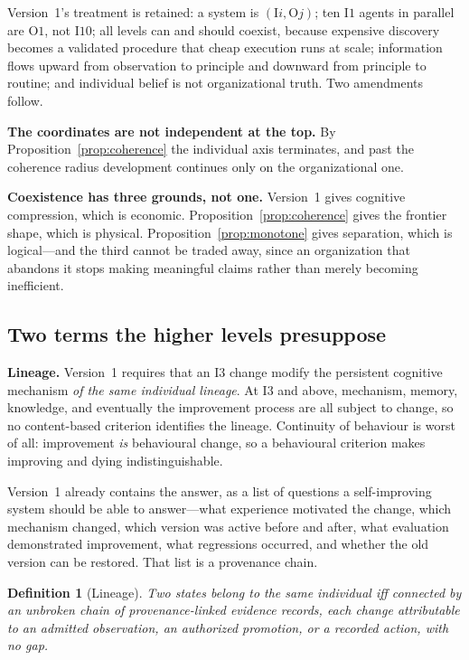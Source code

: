 \documentclass[11pt]{article}
\newtheorem{definition}{Definition}
\newcommand{\Ilev}[1]{\ensuremath{\mathrm{I}#1}}
\newcommand{\Olev}[1]{\ensuremath{\mathrm{O}#1}}
\begin{document}
Version~1's treatment is retained: a system is $(\Ilev{i}, \Olev{j})$; ten \Ilev{1} agents in parallel are \Olev{1}, not $\Ilev{10}$; all levels can and should coexist, because expensive discovery becomes a validated procedure that cheap execution runs at scale; information flows upward from observation to principle and downward from principle to routine; and individual belief is not organizational truth. Two amendments follow.

\textbf{The coordinates are not independent at the top.} By Proposition~\ref{prop:coherence} the individual axis terminates, and past the coherence radius development continues only on the organizational one.

\textbf{Coexistence has three grounds, not one.} Version~1 gives cognitive compression, which is economic. Proposition~\ref{prop:coherence} gives the frontier shape, which is physical. Proposition~\ref{prop:monotone} gives separation, which is logical---and the third cannot be traded away, since an organization that abandons it stops making meaningful claims rather than merely becoming inefficient.

\subsection{Two terms the higher levels presuppose}\label{sec:terms}

\textbf{Lineage.} Version~1 requires that an \Ilev{3} change modify the persistent cognitive mechanism \emph{of the same individual lineage}. At \Ilev{3} and above, mechanism, memory, knowledge, and eventually the improvement process are all subject to change, so no content-based criterion identifies the lineage. Continuity of behaviour is worst of all: improvement \emph{is} behavioural change, so a behavioural criterion makes improving and dying indistinguishable.

Version~1 already contains the answer, as a list of questions a self-improving system should be able to answer---what experience motivated the change, which mechanism changed, which version was active before and after, what evaluation demonstrated improvement, what regressions occurred, and whether the old version can be restored. That list is a provenance chain.

\begin{definition}[Lineage]
Two states belong to the same individual iff connected by an unbroken chain of provenance-linked evidence records, each change attributable to an admitted observation, an authorized promotion, or a recorded action, with no gap.
\end{definition}
\end{document}
